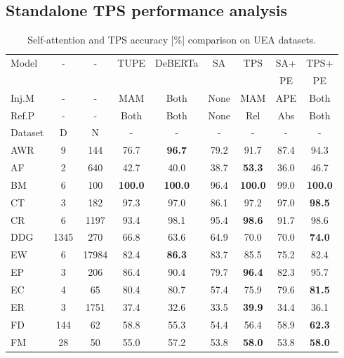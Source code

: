 \documentclass[journal]{IEEEtran}
\begin{document}
\subsection{Standalone TPS performance analysis}
\begin{table}[!t]
\setlength{\tabcolsep}{3pt}


  \centering
  \caption{Self-attention and TPS accuracy [\%] comparison on UEA datasets.}
\begin{threeparttable}
\begin{tabular}{l|c|c|c|c|c|c|c|c}
\toprule
Model & \multicolumn{1}{c}{-} & - & TUPE & DeBERTa & SA & TPS & SA+ & TPS+  \\
  & \multicolumn{1}{c}{} &   & \cite{ke_rethinking_2021} & \cite{he2021deberta} &   &   & PE & PE \\
\midrule
Inj.M & \multicolumn{1}{c}{-} & - & MAM & Both & None & MAM & APE & Both \\
Ref.P & \multicolumn{1}{c}{-} & - & Both & Both & None & Rel & Abs & Both \\
\midrule
Dataset & D\tnote{1} & N\tnote{2} & \multicolumn{1}{c}{-} & - & \multicolumn{1}{c}{-} & \multicolumn{1}{c}{-} & \multicolumn{1}{c}{-} & - \\
\midrule
AWR & 9 & 144 & 76.7 & \textbf{96.7} & 79.2 & 91.7 & 87.4 & 94.3 \\
AF & 2 & 640 & 42.7 & 40.0 & 38.7 & \textbf{53.3} & 36.0 & 46.7 \\
BM & 6 & 100 & \textbf{100.0} & \textbf{100.0} & 96.4 & \textbf{100.0} & 99.0 & \textbf{100.0} \\
CT & 3 & 182 & 97.3 & 97.0 & 86.1 & 97.2 & 97.0 & \textbf{98.5} \\
CR & 6 & 1197 & 93.4 & 98.1 & 95.4 & \textbf{98.6} & 91.7 & 98.6 \\
DDG & 1345 & 270 & 66.8 & 63.6 & 64.9 & 70.0 & 70.0 & \textbf{74.0} \\
EW & 6 & 17984 & 82.4 & \textbf{86.3} & 83.7 & 85.5 & 75.2 & 82.4 \\
EP & 3 & 206 & 86.4 & 90.4 & 79.7 & \textbf{96.4} & 82.3 & 95.7 \\
EC & 4 & 65 & 80.4 & 80.7 & 57.4 & 75.9 & 79.6 & \textbf{81.5} \\
ER & 3 & 1751 & 37.4 & 32.6 & 33.5 & \textbf{39.9} & 34.4 & 36.1 \\
FD & 144 & 62 & 58.8 & 55.3 & 54.4 & 56.4 & 58.9 & \textbf{62.3} \\
FM & 28 & 50 & 55.0 & 57.2 & 53.8 & \textbf{58.0} & 53.8 & \textbf{58.0} \\

\end{tabular}
\end{threeparttable}
\end{table}
\end{document}
